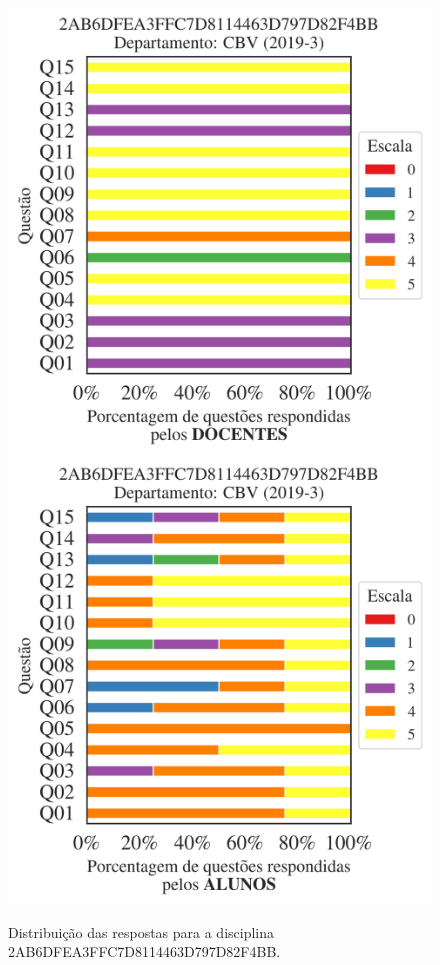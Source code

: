 \documentclass[a4paper,10pt]{article}
\begin{document}
\begin{figure}[h]
\centering
\includegraphics[width=0.485\linewidth]{analise_disciplina_departamento_CBV_2AB6DFEA3FFC7D8114463D797D82F4BB_docentes.png}
\includegraphics[width=0.485\linewidth]{analise_disciplina_departamento_CBV_2AB6DFEA3FFC7D8114463D797D82F4BB_alunos.png}
\caption{\label{fig:analise_geral_departamento}                Distribuição das respostas para a disciplina 2AB6DFEA3FFC7D8114463D797D82F4BB. }
\end{figure}
\end{document}

